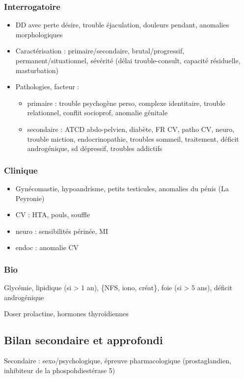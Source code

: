 \documentclass[11pt]{article}
\begin{document}
\subsubsection{Interrogatoire}
\label{sec:org5377fc3}
\begin{itemize}
\item DD avec perte désire, trouble éjaculation, douleurs pendant, anomalies morphologiques
\item Caractérisation : primaire/secondaire, brutal/progressif,
permanent/situationnel, sévérité (délai trouble-consult, capacité résiduelle,
masturbation)
\item Pathologies, facteur :
\begin{itemize}
\item primaire : trouble psychogène perso, complexe identitaire, trouble
relationnel, conflit socioprof, anomalie génitale
\item secondaire : ATCD abdo-pelvien, diabète, FR CV, patho CV, neuro, trouble
miction, endocrinopathie, troubles sommeil, traitement, déficit
androgénique, sd dépressif, troubles addictifs
\end{itemize}
\end{itemize}
\subsubsection{Clinique}
\label{sec:org155a678}
\begin{itemize}
\item Gynécomastie, hypoandrisme, petits testicules, anomalies du pénis (La Peyronie)
\item CV : HTA, pouls, souffle
\item neuro : sensibilités périnée, MI
\item endoc : anomalie CV
\end{itemize}
\subsubsection{Bio}
\label{sec:orgf1efa5d}
Glycémie, lipidique (si > 1 an), \{NFS, iono, créat\}, foie (si > 5 ans), déficit
androgénique

Doser prolactine, hormones thyroïdiennes

\subsection{Bilan secondaire et approfondi}
\label{sec:org1eb7017}
Secondaire : sexo/psychologique, épreuve pharmacologique (prostaglandien,
inhibiteur de la phospohdiestérase 5)
\end{document}
